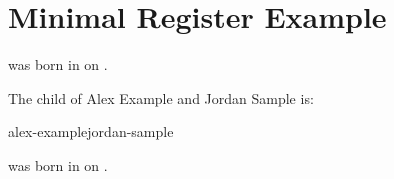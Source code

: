 \documentclass{article}
\begin{document}
\section*{Minimal Register Example}

\begin{registersection}
 was born in  on .

The child of Alex Example and Jordan Sample is:
\begin{childrenof}{alex-example}{jordan-sample}
\end{childrenof}

 was born in  on .
\end{registersection}

\checkregister
\end{document}
